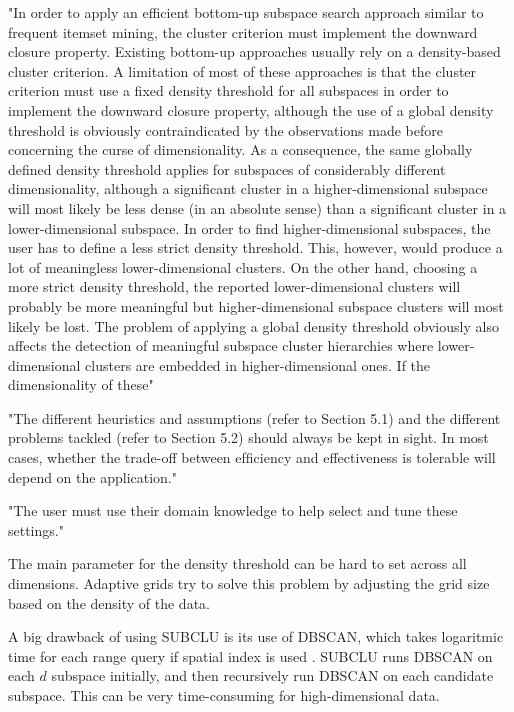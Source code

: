 "In order to apply an efficient bottom-up subspace search approach similar to frequent itemset mining, the cluster criterion must implement the downward closure property. Existing bottom-up approaches usually rely on a density-based cluster criterion. A limitation of most of these approaches is that the cluster criterion must use a ﬁxed density threshold for all subspaces in order to implement the downward closure property, although the use of a global density threshold is obviously contraindicated by the observations made before concerning the curse of dimensionality. As a consequence, the same globally deﬁned density threshold applies for subspaces of considerably different dimensionality, although a signiﬁcant cluster in a higher-dimensional subspace will most likely be less dense (in an absolute sense) than a signiﬁcant cluster in a lower-dimensional subspace. In order to ﬁnd higher-dimensional subspaces, the user has to deﬁne a
less strict density threshold. This, however, would produce a lot of meaningless lower-dimensional clusters. On the other hand, choosing a more strict density threshold, the reported lower-dimensional clusters will probably be more meaningful but higher-dimensional subspace clusters will most likely be lost. The
problem of applying a global density threshold obviously also affects the detection of meaningful subspace cluster hierarchies where lower-dimensional clusters are embedded in higher-dimensional ones. If the dimensionality of these" \cite[p.1:48]{kriegel-2009}

"The different heuristics and assumptions (refer to Section 5.1) and the different problems tackled (refer to Section 5.2) should always be kept in sight. In most cases, whether the trade-off between efﬁciency and effectiveness is tolerable will depend on the application." \cite[p.1:50]{kriegel-2009}

"The user must use their domain knowledge to help select and tune these settings." \cite{parsons-2-2004}

The main parameter for the density threshold can be hard to set across all dimensions. Adaptive grids try to solve this problem by adjusting the grid size based on the density of the data.

A big drawback of using SUBCLU is its use of DBSCAN, which takes logaritmic time for each range query if spatial index is used \cite[p.~473]{han-2011}. SUBCLU runs DBSCAN on each $d$ subspace initially, and then recursively run DBSCAN on each candidate subspace. This can be very time-consuming for high-dimensional data.


